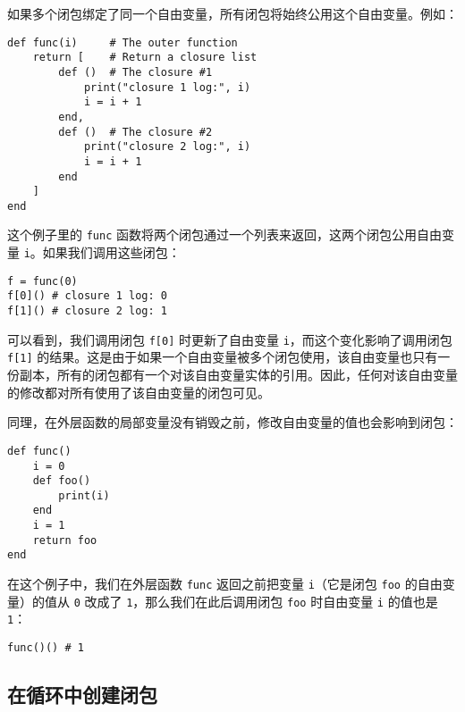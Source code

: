 如果多个闭包绑定了同一个自由变量，所有闭包将始终公用这个自由变量。例如：
\begin{lstlisting}[language=berry]
def func(i)     # The outer function
    return [    # Return a closure list
        def ()  # The closure #1
            print("closure 1 log:", i)
            i = i + 1
        end,
        def ()  # The closure #2
            print("closure 2 log:", i)
            i = i + 1
        end
    ]
end
\end{lstlisting}
这个例子里的 \texttt{func} 函数将两个闭包通过一个列表来返回，这两个闭包公用自由变量 \texttt{i}。如果我们调用这些闭包：
\begin{lstlisting}[language=berry]
f = func(0)
f[0]() # closure 1 log: 0
f[1]() # closure 2 log: 1
\end{lstlisting}
可以看到，我们调用闭包 \texttt{f[0]} 时更新了自由变量 \texttt{i}，而这个变化影响了调用闭包 \texttt{f[1]} 的结果。这是由于如果一个自由变量被多个闭包使用，该自由变量也只有一份副本，所有的闭包都有一个对该自由变量实体的引用。因此，任何对该自由变量的修改都对所有使用了该自由变量的闭包可见。

同理，在外层函数的局部变量没有销毁之前，修改自由变量的值也会影响到闭包：
\begin{lstlisting}[language=berry]
def func()
    i = 0
    def foo()
        print(i)
    end
    i = 1
    return foo
end
\end{lstlisting}
在这个例子中，我们在外层函数 \texttt{func} 返回之前把变量 \texttt{i}（它是闭包 \texttt{foo} 的自由变量）的值从 \texttt{0} 改成了 \texttt{1}，那么我们在此后调用闭包 \texttt{foo} 时自由变量 \texttt{i} 的值也是 \texttt{1}：
\begin{lstlisting}[language=berry]
func()() # 1
\end{lstlisting}

\subsection{在循环中创建闭包}

